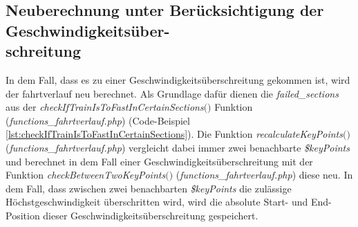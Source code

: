 \subsection{Neuberechnung unter Berücksichtigung der Geschwindigkeitsüber-\\schreitung} \label{neuberechnung}
In dem Fall, dass es zu einer Geschwindigkeitsüberschreitung gekommen ist, wird der \Gls{fahrtverlauf} neu berechnet. Als Grundlage dafür dienen die \textit{failed\_sections} aus der \textit{check\-If\-Train\-Is\-To\-Fast\-In\-Certain\-Sections$($$)$} Funktion (\textit{functions\_fahrtverlauf.php}) (Code-Beispiel \ref{lst:checkIfTrainIsToFastInCertainSections}). Die Funktion \textit{recalculate\-Key\-Points$($$)$} (\textit{functions\_fahrtverlauf.php}) vergleicht dabei immer zwei benachbarte \textit{\$keyPoints} und berechnet in dem Fall einer Geschwindigkeitsüberschreitung mit der Funktion \textit{check\-Between\-Two\-Key\-Points$($$)$} (\textit{func\-tions\_fahrt\-ver\-lauf\-.php}) diese neu. In dem Fall, dass zwischen zwei benachbarten \textit{\$keyPoints} die zulässige Höchst\-ge\-schwin\-dig\-keit überschritten wird, wird die absolute Start- und End-Position dieser Ge\-schwin\-digkeits\-über\-schrei\-tung gespeichert. 

